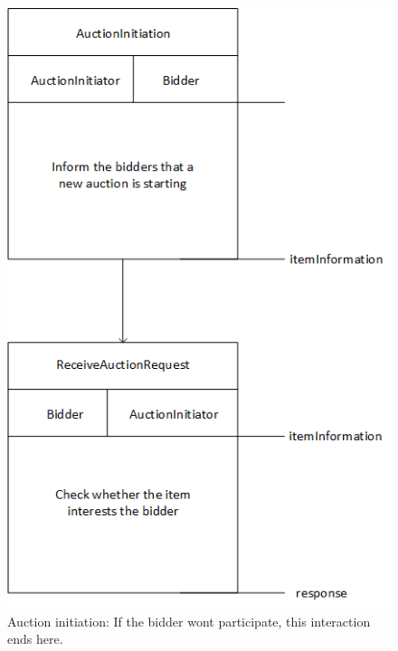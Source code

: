 \documentclass[a4paper, 11pt]{article}
\begin{document}
\begin{figure}[H]
	\caption{Auction initiation: If the bidder wont participate, this interaction ends here.}
	\centering
	\includegraphics[scale=0.8]{./images/interaction-auction-init.png}
\end{figure}
\end{document}
